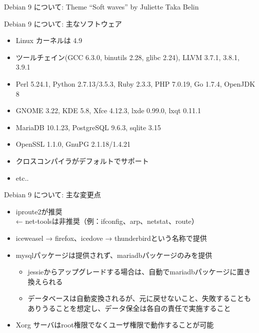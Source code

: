 \documentclass[cjk,c,squeeze,shrink,dvipdfmx,12pt]{beamer}
\begin{document}
\begin{frame}[fragile]{Debian 9 について: Theme}%
  \centering
  {\small{``Soft waves'' by Juliette Taka Belin}}
\end{frame}


\begin{frame}[fragile]{Debian 9 について: 主なソフトウェア}%

\begin{itemize}
\item Linux カーネルは 4.9
\item ツールチェイン(GCC 6.3.0, binutils 2.28, glibc 2.24), LLVM 3.7.1, 3.8.1, 3.9.1
\item Perl 5.24.1, Python 2.7.13/3.5.3, Ruby 2.3.3, PHP 7.0.19, Go 1.7.4, OpenJDK 8
\item GNOME 3.22, KDE 5.8, Xfce 4.12.3, lxde 0.99.0, lxqt 0.11.1
\item MariaDB 10.1.23, PostgreSQL 9.6.3, sqlite 3.15
\item OpenSSL 1.1.0, GnuPG 2.1.18/1.4.21
\item クロスコンパイラがデフォルトでサポート
\item etc..
\end{itemize}

\end{frame}


\begin{frame}[fragile]{Debian 9 について: 主な変更点}%

\begin{itemize}
\item iproute2が推奨\\
 ← net-toolsは非推奨（例：ifconfig、arp、netstat、route）
\item iceweasel → firefox、icedove → thunderbirdという名称で提供
\item mysqlパッケージは提供されず、mariadbパッケージのみを提供
  \begin{itemize}
  \item jessieからアップグレードする場合は、自動でmariadbパッケージに置き換えられる
  \item データベースは自動変換されるが、元に戻せないこと、失敗することもありうることを想定し、データ保全は各自の責任で実施すること
  \end{itemize}
\item Xorg サーバはroot権限でなくユーザ権限で動作することが可能
\end{itemize}
\end{frame}
\end{document}
